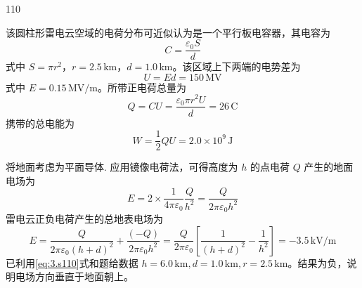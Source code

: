 \begin{solution}{110}
\begin{subsolution}
该圆柱形雷电云空域的电荷分布可近似认为是一个平行板电容器，其电容为
\begin{equation}
C = \frac{\varepsilon_{0} S}{d}
\label{eq:1.s110}
\end{equation}
式中 $S = \pi r^{2}$，$r = 2.5\,\mathrm{km}$，$d = 1.0\,\mathrm{km}$。该区域上下两端的电势差为
\begin{equation}
U = E d = 150\,\mathrm{MV}
\label{eq:2.s110}
\end{equation}
式中 $E = 0.15\,\mathrm{MV/m}$。所带正电荷总量为
\begin{equation}
Q = C U = \frac{\varepsilon_{0} \pi r^{2} U}{d} = 26\,\mathrm{C}
\label{eq:3.s110}
\end{equation}
携带的总电能为
\begin{equation}
W = \frac{1}{2} Q U = 2.0 \times 10^{9}\,\mathrm{J}
\label{eq:4.s110}
\end{equation}
\end{subsolution}

\begin{subsolution}
将地面考虑为平面导体. 应用镜像电荷法，可得高度为 $h$ 的点电荷 $Q$ 产生的地面电场为
\begin{equation}
E = 2 \times \frac{1}{4\pi\varepsilon_{0}} \frac{Q}{h^{2}} = \frac{Q}{2\pi\varepsilon_{0} h^{2}}
\label{eq:5.s110}
\end{equation}
雷电云正负电荷产生的总地表电场为
\begin{equation}
E = \frac{Q}{2\pi\varepsilon_{0} (h + d)^{2}} + \frac{(-Q)}{2\pi\varepsilon_{0} h^{2}} = \frac{Q}{2\pi\varepsilon_{0}} \left[ \frac{1}{(h + d)^{2}} - \frac{1}{h^{2}} \right] = -3.5\,\mathrm{kV/m}
\label{eq:6.s110}
\end{equation}
已利用\eqref{eq:3.s110}式和题给数据 $h = 6.0\,\mathrm{km}, d = 1.0\,\mathrm{km}, r = 2.5\,\mathrm{km}$。结果为负，说明电场方向垂直于地面朝上。


\end{subsolution}
\end{solution}
